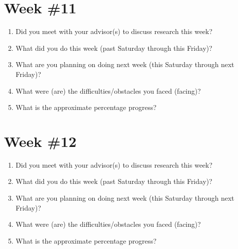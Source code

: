 \documentclass[letterpaper,12pt,fleqn]{article}
\begin{document}
\clearpage
\section*{Week \#11}

\begin{spacing}{1.50}
  \begin{enumerate}
    \item Did you meet with your advisor(s) to discuss research this week?
          \vfill

    \item What did you do this week (past Saturday through this Friday)? 
          \vfill

    \item What are you planning on doing next week (this Saturday through next Friday)? 
          \vfill

    \item What were (are) the difficulties/obstacles you faced (facing)?
          \vfill

    \item What is the approximate percentage progress?
          \vfill
  \end{enumerate}
\end{spacing}

\clearpage
\section*{Week \#12}

\begin{spacing}{1.50}
  \begin{enumerate}
    \item Did you meet with your advisor(s) to discuss research this week?
          \vfill

    \item What did you do this week (past Saturday through this Friday)? 
          \vfill

    \item What are you planning on doing next week (this Saturday through next Friday)? 
          \vfill

    \item What were (are) the difficulties/obstacles you faced (facing)?
          \vfill

    \item What is the approximate percentage progress?
          \vfill
  \end{enumerate}
\end{spacing}
\end{document}
